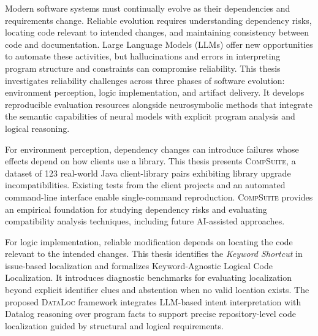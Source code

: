 \documentclass[12pt,a4paper]{Thesis} %
\newcommand{\toolcompsuite}{\textsc{CompSuite}\xspace}
\newcommand{\tooldataloc}{\textsc{DataLoc}\xspace}
\begin{document}
\pagestyle{fancy} %
\fancyhead{}   %
\fancyhead[LO]{\sl{\leftmark}}
\fancyhead[RE]{\sl{\rightmark}}
\fancyhead[LE,RO]{\thepage}





Modern software systems must continually evolve as their dependencies and requirements change. Reliable evolution requires understanding dependency risks, locating code relevant to intended changes, and maintaining consistency between code and documentation. Large Language Models (LLMs) offer new opportunities to automate these activities, but hallucinations and errors in interpreting program structure and constraints can compromise reliability. This thesis investigates reliability challenges across three phases of software evolution: environment perception, logic implementation, and artifact delivery. It develops reproducible evaluation resources alongside neurosymbolic methods that integrate the semantic capabilities of neural models with explicit program analysis and logical reasoning.

For environment perception, dependency changes can introduce failures whose effects depend on how clients use a library. This thesis presents \toolcompsuite, a dataset of 123 real-world Java client-library pairs exhibiting library upgrade incompatibilities. Existing tests from the client projects and an automated command-line interface enable single-command reproduction. \toolcompsuite provides an empirical foundation for studying dependency risks and evaluating compatibility analysis techniques, including future AI-assisted approaches.

For logic implementation, reliable modification depends on locating the code relevant to the intended changes. This thesis identifies the \textit{Keyword Shortcut} in issue-based localization and formalizes Keyword-Agnostic Logical Code Localization. It introduces diagnostic benchmarks for evaluating localization beyond explicit identifier clues and abstention when no valid location exists. The proposed \tooldataloc framework integrates LLM-based intent interpretation with Datalog reasoning over program facts to support precise repository-level code localization guided by structural and logical requirements.
\end{document}
